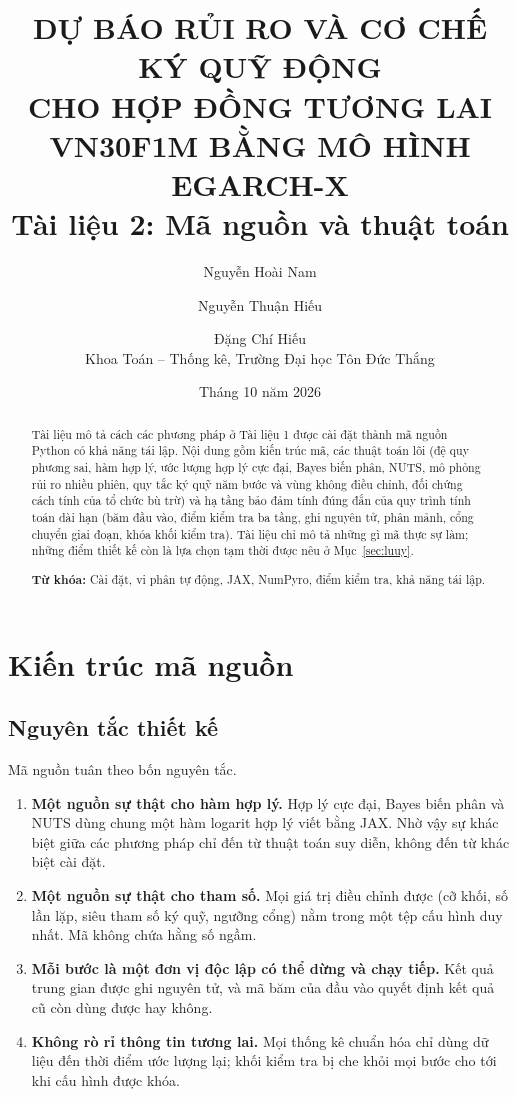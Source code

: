 \documentclass[12pt,a4paper]{article}
\title{\textbf{DỰ BÁO RỦI RO VÀ CƠ CHẾ KÝ QUỸ ĐỘNG\\ CHO HỢP ĐỒNG TƯƠNG LAI VN30F1M BẰNG MÔ HÌNH EGARCH-X}\\[8pt]
\large Tài liệu 2: Mã nguồn và thuật toán}
\author{Nguyễn Hoài Nam \and Nguyễn Thuận Hiếu \and Đặng Chí Hiếu\\[4pt]
\small Khoa Toán -- Thống kê, Trường Đại học Tôn Đức Thắng}
\date{Tháng 10 năm 2026}
\theoremstyle{remark}
\begin{document}
\maketitle
\thispagestyle{empty}

\begin{abstract}
\noindent Tài liệu mô tả cách các phương pháp ở Tài liệu 1 được cài đặt thành mã nguồn Python có khả năng tái lập. Nội dung gồm kiến trúc mã, các thuật toán lõi (đệ quy phương sai, hàm hợp lý, ước lượng hợp lý cực đại, Bayes biến phân, NUTS, mô phỏng rủi ro nhiều phiên, quy tắc ký quỹ năm bước và vùng không điều chỉnh, đối chứng cách tính của tổ chức bù trừ) và hạ tầng bảo đảm tính đúng đắn của quy trình tính toán dài hạn (băm đầu vào, điểm kiểm tra ba tầng, ghi nguyên tử, phân mảnh, cổng chuyển giai đoạn, khóa khối kiểm tra). Tài liệu chỉ mô tả những gì mã thực sự làm; những điểm thiết kế còn là lựa chọn tạm thời được nêu ở Mục~\ref{sec:luuy}.

\medskip
\noindent\textbf{Từ khóa:} Cài đặt, vi phân tự động, JAX, NumPyro, điểm kiểm tra, khả năng tái lập.
\end{abstract}

\newpage
\tableofcontents
\newpage

\section{Kiến trúc mã nguồn}\label{sec:kientruc}

\subsection{Nguyên tắc thiết kế}

Mã nguồn tuân theo bốn nguyên tắc.
\begin{enumerate}
\item \textbf{Một nguồn sự thật cho hàm hợp lý.} Hợp lý cực đại, Bayes biến phân và NUTS dùng chung một hàm logarit hợp lý viết bằng JAX. Nhờ vậy sự khác biệt giữa các phương pháp chỉ đến từ thuật toán suy diễn, không đến từ khác biệt cài đặt.
\item \textbf{Một nguồn sự thật cho tham số.} Mọi giá trị điều chỉnh được (cỡ khối, số lần lặp, siêu tham số ký quỹ, ngưỡng cổng) nằm trong một tệp cấu hình duy nhất. Mã không chứa hằng số ngầm.
\item \textbf{Mỗi bước là một đơn vị độc lập có thể dừng và chạy tiếp.} Kết quả trung gian được ghi nguyên tử, và mã băm của đầu vào quyết định kết quả cũ còn dùng được hay không.
\item \textbf{Không rò rỉ thông tin tương lai.} Mọi thống kê chuẩn hóa chỉ dùng dữ liệu đến thời điểm ước lượng lại; khối kiểm tra bị che khỏi mọi bước cho tới khi cấu hình được khóa.
\end{enumerate}
\end{document}
